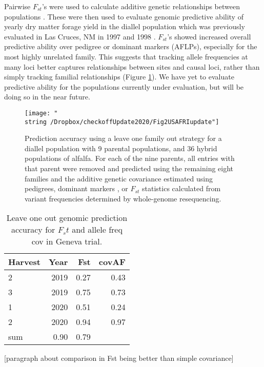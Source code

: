 \documentclass[12pt, letterpaper]{article}
\begin{document}

Pairwise $F_{st}$'s were used to calculate additive genetic relationships between populations \parencite{weir2002}. These were then used to evaluate genomic predictive ability of yearly dry matter forage yield in the diallel population which was previously evaluated in Las Cruces, NM in 1997 and 1998 \parencite{segovia2004}. $F_{st}$'s showed increased overall predictive ability over pedigree or dominant markers (AFLPs), especially for the most highly unrelated family. This suggests that tracking allele frequencies at many loci better captures relationships between sites and causal loci, rather than simply tracking familial relationships (Figure \ref{predacc}). We have yet to evaluate predictive ability for the populations currently under evaluation, but will be doing so in the near future. 

\begin{figure}
\texttt{[image: "\\string~/Dropbox/checkoffUpdate2020/Fig2USAFRIupdate"]}
\caption{Prediction accuracy using a leave one family out strategy for a diallel population with 9 parental populations, and 36 hybrid populations of alfalfa. For each of the nine parents, all entries with that parent were removed and predicted using the remaining eight families and the additive genetic covariance estimated using pedigrees, dominant markers \parencite[AFLPs;][]{segovia2004}, or $F_{st}$ statistics calculated from variant frequencies determined by whole-genome resequencing.}
\label{predacc}
\end{figure}



\begin{table}[ht]
\caption{Leave one out genomic prediction accuracy for $F_st$ and allele freq cov in Geneva trial.}
\centering
\begin{tabular}{lrrr}
  \hline
 Harvest & Year & Fst & covAF \\ 
  \hline
  2 & 2019 & 0.27 & 0.43 \\ 
  3 & 2019 & 0.75 & 0.73 \\ 
  1 & 2020 & 0.51 & 0.24 \\ 
  2 & 2020 & 0.94 & 0.97 \\ 
  sum & 0.90 & 0.79 \\ 
   \hline
\end{tabular}
\end{table}


[paragraph about comparison in Fst being better than simple covariance]
\end{document}
